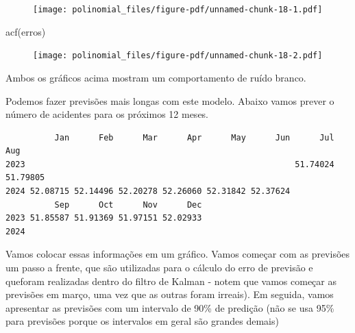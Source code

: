\documentclass[
  letterpaper,
  DIV=11,
  numbers=noendperiod]{scrreprt}
\newenvironment{Shaded}{\begin{snugshade}}{\end{snugshade}}
\newcommand{\DecValTok}[1]{\textcolor[rgb]{0.68,0.00,0.00}{#1}}
\newcommand{\FunctionTok}[1]{\textcolor[rgb]{0.28,0.35,0.67}{#1}}
\newcommand{\NormalTok}[1]{\textcolor[rgb]{0.00,0.23,0.31}{#1}}
\newcommand{\OtherTok}[1]{\textcolor[rgb]{0.00,0.23,0.31}{#1}}
\newcommand{\SpecialCharTok}[1]{\textcolor[rgb]{0.37,0.37,0.37}{#1}}
\begin{document}
\begin{figure}[H]

{\centering \texttt{[image: polinomial\_files/figure-pdf/unnamed-chunk-18-1.pdf]}

}

\end{figure}

\begin{Shaded}
\begin{Highlighting}[]
\FunctionTok{acf}\NormalTok{(erros)}
\end{Highlighting}
\end{Shaded}

\begin{figure}[H]

{\centering \texttt{[image: polinomial\_files/figure-pdf/unnamed-chunk-18-2.pdf]}

}

\end{figure}

Ambos os gráficos acima mostram um comportamento de ruído branco.

Podemos fazer previsões mais longas com este modelo. Abaixo vamos prever
o número de acidentes para os próximos 12 meses.

\begin{Shaded}
\end{Shaded}

\begin{verbatim}
          Jan      Feb      Mar      Apr      May      Jun      Jul      Aug
2023                                                       51.74024 51.79805
2024 52.08715 52.14496 52.20278 52.26060 52.31842 52.37624                  
          Sep      Oct      Nov      Dec
2023 51.85587 51.91369 51.97151 52.02933
2024                                    
\end{verbatim}

Vamos colocar essas informações em um gráfico. Vamos começar com as
previsões um passo a frente, que são utilizadas para o cálculo do erro
de previsão e queforam realizadas dentro do filtro de Kalman - notem que
vamos começar as previsões em março, uma vez que as outras foram
irreais). Em seguida, vamos apresentar as previsões com um intervalo de
90\% de predição (não se usa 95\% para previsões porque os intervalos em
geral são grandes demais)
\end{document}
